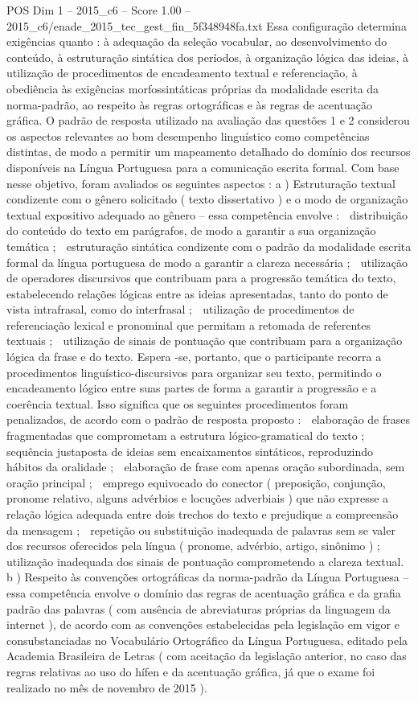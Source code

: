\begin{textsample}{POS Dim 1 – 2015\_c6 – Score 1.00 – 2015\_c6/enade\_2015\_tec\_gest\_fin\_5f348948fa.txt}
Essa configuração determina exigências quanto : à adequação da seleção vocabular, ao desenvolvimento do conteúdo, à estruturação sintática dos períodos, à organização lógica das ideias, à utilização de procedimentos de encadeamento textual e referenciação, à obediência às exigências morfossintáticas próprias da modalidade escrita da norma-padrão, ao respeito às regras ortográficas e às regras de acentuação gráfica.
O padrão de resposta utilizado na avaliação das questões 1 e 2 considerou os aspectos relevantes ao bom desempenho linguístico como competências distintas, de modo a permitir um mapeamento detalhado do domínio dos recursos disponíveis na Língua Portuguesa para a comunicação escrita formal.
Com base nesse objetivo, foram avaliados os seguintes aspectos : a ) Estruturação textual condizente com o gênero solicitado ( texto dissertativo ) e o modo de organização textual expositivo adequado ao gênero – essa competência envolve :  distribuição do conteúdo do texto em parágrafos, de modo a garantir a sua organização temática ;  estruturação sintática condizente com o padrão da modalidade escrita formal da língua portuguesa de modo a garantir a clareza necessária ;  utilização de operadores discursivos que contribuam para a progressão temática do texto, estabelecendo relações lógicas entre as ideias apresentadas, tanto do ponto de vista intrafrasal, como do interfrasal ;  utilização de procedimentos de referenciação lexical e pronominal que permitam a retomada de referentes textuais ;  utilização de sinais de pontuação que contribuam para a organização lógica da frase e do texto.
Espera -se, portanto, que o participante recorra a procedimentos linguístico-discursivos para organizar seu texto, permitindo o encadeamento lógico entre suas partes de forma a garantir a progressão e a coerência textual.
Isso significa que os seguintes procedimentos foram penalizados, de acordo com o padrão de resposta proposto :  elaboração de frases fragmentadas que comprometam a estrutura lógico-gramatical do texto ;  sequência justaposta de ideias sem encaixamentos sintáticos, reproduzindo hábitos da oralidade ;  elaboração de frase com apenas oração subordinada, sem oração principal ;  emprego equivocado do conector ( preposição, conjunção, pronome relativo, alguns advérbios e locuções adverbiais ) que não expresse a relação lógica adequada entre dois trechos do texto e prejudique a compreensão da mensagem ;  repetição ou substituição inadequada de palavras sem se valer dos recursos oferecidos pela língua ( pronome, advérbio, artigo, sinônimo ) ;  utilização inadequada dos sinais de pontuação comprometendo a clareza textual. b ) Respeito às convenções ortográficas da norma-padrão da Língua Portuguesa – essa competência envolve o domínio das regras de acentuação gráfica e da grafia padrão das palavras ( com ausência de abreviaturas próprias da linguagem da internet ), de acordo com as convenções estabelecidas pela legislação em vigor e consubstanciadas no Vocabulário Ortográfico da Língua Portuguesa, editado pela Academia Brasileira de Letras ( com aceitação da legislação anterior, no caso das regras relativas ao uso do hífen e da acentuação gráfica, já que o exame foi realizado no mês de novembro de 2015 ).

\end{textsample}
